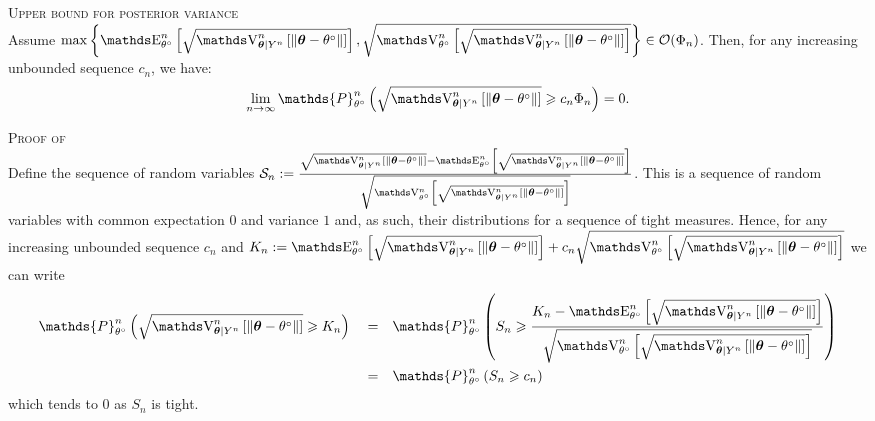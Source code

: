 \begin{lm}\label{LM_BAYES_STRATEGIES_UPPERVAR}{\textsc{Upper bound for posterior variance}\\}
Assume $\max\left\{ \E^{n}_{\theta^{\circ}}\left[\sqrt{\V^{n}_{\boldsymbol{\theta} \vert Y^{n}}\left[\Vert \boldsymbol{\theta} - \theta^{\circ} \Vert\right]}\right], \sqrt{\V^{n}_{\theta^{\circ}}\left[ \sqrt{\V^{n}_{\boldsymbol{\theta} \vert Y^{n}}\left[\Vert \boldsymbol{\theta} - \theta^{\circ} \Vert\right]}\right]} \right\} \in \mathcal{O}(\Phi_{n})$.
Then, for any increasing unbounded sequence $c_{n}$, we have:
\[\lim\limits_{n \rightarrow \infty} \mathds{P}_{\theta^{\circ}}^{n}\left(\sqrt{\V_{\boldsymbol{\theta} \vert Y^{n}}^{n}\left[\Vert \boldsymbol{\theta} - \theta^{\circ} \Vert \right]} \geq c_{n}\Phi_{n}\right) = 0.\]
\end{lm}

\begin{pro}\label{PRO_BAYES_STRATEGIES_UPPERVAR}{\textsc{Proof of }\\}
Define the sequence of random variables $\mathcal{S}_{n} := \frac{\sqrt{\V_{\boldsymbol{\theta} \vert Y^{n}}^{n}\left[\Vert \boldsymbol{\theta} - \theta^{\circ} \Vert \right]} - \E^{n}_{\theta^{\circ}}\left[\sqrt{\V_{\boldsymbol{\theta} \vert Y^{n}}^{n}\left[\Vert \boldsymbol{\theta} - \theta^{\circ} \Vert \right]}\right]}{\sqrt{\V^{n}_{\theta^{\circ}}\left[\sqrt{\V_{\boldsymbol{\theta} \vert Y^{n}}^{n}\left[\Vert \boldsymbol{\theta} - \theta^{\circ} \Vert \right]}\right]}}$.
This is a sequence of random variables with common expectation $0$ and variance $1$ and, as such, their distributions for a sequence of tight measures.
Hence, for any increasing unbounded sequence $c_{n}$ and $K_{n} := \E^{n}_{\theta^{\circ}}\left[\sqrt{\V_{\boldsymbol{\theta} \vert Y^{n}}^{n}\left[\Vert \boldsymbol{\theta} - \theta^{\circ} \Vert \right]}\right] + c_{n} \sqrt{\V^{n}_{\theta^{\circ}}\left[\sqrt{\V_{\boldsymbol{\theta} \vert Y^{n}}^{n}\left[\Vert \boldsymbol{\theta} - \theta^{\circ} \Vert \right]}\right]}$ we can write
\begin{alignat*}{3}
& \mathds{P}_{\theta^{\circ}}^{n}\left(\sqrt{\V_{\boldsymbol{\theta} \vert Y^{n}}^{n}\left[\Vert \boldsymbol{\theta} - \theta^{\circ} \Vert \right]} \geq K_{n}\right) && = && \mathds{P}_{\theta^{\circ}}^{n}\left(S_{n} \geq \frac{K_{n} - \E^{n}_{\theta^{\circ}}\left[\sqrt{\V_{\boldsymbol{\theta} \vert Y^{n}}^{n}\left[\Vert \boldsymbol{\theta} - \theta^{\circ} \Vert \right]}\right]}{\sqrt{\V^{n}_{\theta^{\circ}}\left[\sqrt{\V_{\boldsymbol{\theta} \vert Y^{n}}^{n}\left[\Vert \boldsymbol{\theta} - \theta^{\circ} \Vert \right]}\right]}}\right)\\
& &&=&& \mathds{P}_{\theta^{\circ}}^{n}\left(S_{n} \geq c_{n}\right)
\end{alignat*}
which tends to $0$ as $S_{n}$ is tight.
\qedsymbol
\end{pro}

